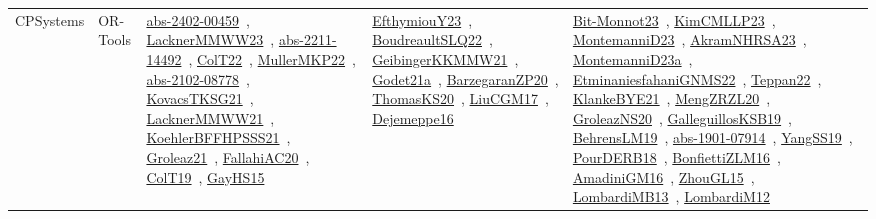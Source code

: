 {\begin{longtable}{lp{3cm}>{\raggedright\arraybackslash}p{6cm}>{\raggedright\arraybackslash}p{6cm}>{\raggedright\arraybackslash}p{8cm}}
CPSystems & OR-Tools & \href{works/abs-2402-00459.pdf}{abs-2402-00459}~\cite{abs-2402-00459}, \href{works/LacknerMMWW23.pdf}{LacknerMMWW23}~\cite{LacknerMMWW23}, \href{works/abs-2211-14492.pdf}{abs-2211-14492}~\cite{abs-2211-14492}, \href{works/ColT22.pdf}{ColT22}~\cite{ColT22}, \href{works/MullerMKP22.pdf}{MullerMKP22}~\cite{MullerMKP22}, \href{works/abs-2102-08778.pdf}{abs-2102-08778}~\cite{abs-2102-08778}, \href{works/KovacsTKSG21.pdf}{KovacsTKSG21}~\cite{KovacsTKSG21}, \href{works/LacknerMMWW21.pdf}{LacknerMMWW21}~\cite{LacknerMMWW21}, \href{works/KoehlerBFFHPSSS21.pdf}{KoehlerBFFHPSSS21}~\cite{KoehlerBFFHPSSS21}, \href{works/Groleaz21.pdf}{Groleaz21}~\cite{Groleaz21}, \href{works/FallahiAC20.pdf}{FallahiAC20}~\cite{FallahiAC20}, \href{works/ColT19.pdf}{ColT19}~\cite{ColT19}, \href{works/GayHS15.pdf}{GayHS15}~\cite{GayHS15} & \href{works/EfthymiouY23.pdf}{EfthymiouY23}~\cite{EfthymiouY23}, \href{works/BoudreaultSLQ22.pdf}{BoudreaultSLQ22}~\cite{BoudreaultSLQ22}, \href{works/GeibingerKKMMW21.pdf}{GeibingerKKMMW21}~\cite{GeibingerKKMMW21}, \href{works/Godet21a.pdf}{Godet21a}~\cite{Godet21a}, \href{works/BarzegaranZP20.pdf}{BarzegaranZP20}~\cite{BarzegaranZP20}, \href{works/ThomasKS20.pdf}{ThomasKS20}~\cite{ThomasKS20}, \href{works/LiuCGM17.pdf}{LiuCGM17}~\cite{LiuCGM17}, \href{works/Dejemeppe16.pdf}{Dejemeppe16}~\cite{Dejemeppe16} & \href{works/Bit-Monnot23.pdf}{Bit-Monnot23}~\cite{Bit-Monnot23}, \href{works/KimCMLLP23.pdf}{KimCMLLP23}~\cite{KimCMLLP23}, \href{works/MontemanniD23.pdf}{MontemanniD23}~\cite{MontemanniD23}, \href{works/AkramNHRSA23.pdf}{AkramNHRSA23}~\cite{AkramNHRSA23}, \href{works/MontemanniD23a.pdf}{MontemanniD23a}~\cite{MontemanniD23a}, \href{works/EtminaniesfahaniGNMS22.pdf}{EtminaniesfahaniGNMS22}~\cite{EtminaniesfahaniGNMS22}, \href{works/Teppan22.pdf}{Teppan22}~\cite{Teppan22}, \href{works/KlankeBYE21.pdf}{KlankeBYE21}~\cite{KlankeBYE21}, \href{works/MengZRZL20.pdf}{MengZRZL20}~\cite{MengZRZL20}, \href{works/GroleazNS20.pdf}{GroleazNS20}~\cite{GroleazNS20}, \href{works/GalleguillosKSB19.pdf}{GalleguillosKSB19}~\cite{GalleguillosKSB19}, \href{works/BehrensLM19.pdf}{BehrensLM19}~\cite{BehrensLM19}, \href{works/abs-1901-07914.pdf}{abs-1901-07914}~\cite{abs-1901-07914}, \href{works/YangSS19.pdf}{YangSS19}~\cite{YangSS19}, \href{works/PourDERB18.pdf}{PourDERB18}~\cite{PourDERB18}, \href{works/BonfiettiZLM16.pdf}{BonfiettiZLM16}~\cite{BonfiettiZLM16}, \href{works/AmadiniGM16.pdf}{AmadiniGM16}~\cite{AmadiniGM16}, \href{works/ZhouGL15.pdf}{ZhouGL15}~\cite{ZhouGL15}, \href{works/LombardiMB13.pdf}{LombardiMB13}~\cite{LombardiMB13}, \href{works/LombardiM12.pdf}{LombardiM12}~\cite{LombardiM12}\\

\end{longtable}}
